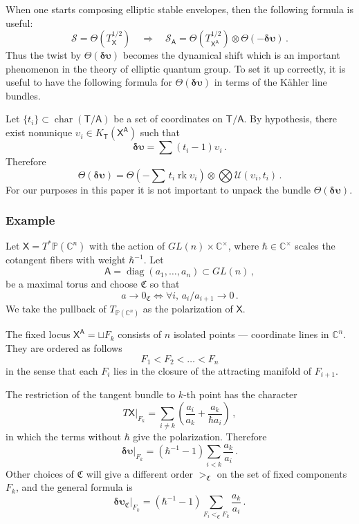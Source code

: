 \documentclass[14pt]{extarticle}
\newcommand{\C}{\mathbb{C}}
\newcommand{\Ct}{\mathbb{C}^\times}
\newcommand{\bT}{\mathsf{T}}
\newcommand{\bA}{\mathsf{A}}
\newcommand{\bX}{\mathsf{X}}
\newcommand{\bP}{\mathbb{P}}
\newcommand{\cU}{\mathscr{U}}
\newcommand{\du}{\boldsymbol{\delta\upsilon}}
\newcommand{\fC}{\mathfrak{C}}
\newcommand{\cS}{\mathscr{S}}
\DeclareMathOperator{\cha}{char}
\DeclareMathOperator{\rk}{rk}
\DeclareMathOperator{\diag}{diag}
\theoremstyle{definition}
\begin{document}
\subsubsection{}

When one starts composing elliptic stable envelopes, then the 
following formula is useful: 
%
\begin{equation}
\cS = \Theta(T^{1/2}_\bX) \quad \Rightarrow
\quad
\cS_\bA = \Theta(T^{1/2}_{\bX^\bA}) \otimes \Theta(-\du)
\,. \label{cSbAdu}
\end{equation}
%
Thus the twist
by $\Theta(\du)$ becomes the dynamical shift which is an important
phenomenon in the theory of elliptic quantum group. To set it up
correctly, it is useful to have the following
formula for $\Theta(\du)$ in terms of the K\"ahler line bundles. 

Let $\{t_i\}\subset \cha(\bT/\bA)$ be a set of coordinates on
$\bT/\bA$. By hypothesis, there exist nonunique $\upsilon_i \in
K_\bT(\bX^\bA)$ such that 
$$
\du = \sum (t_i-1) \upsilon_i \,. 
$$
Therefore
%
\begin{equation}
  \label{Thdyn}
  \Theta(\du) = \Theta(-{\textstyle \sum} \, t_i \rk \upsilon_i) \otimes
\bigotimes \cU(\upsilon_i,  t_i) \,.
\end{equation}
%
For our purposes in this
paper it is not important to unpack the bundle $\Theta(\du)$. 

\subsubsection{Example}\label{ex_2} 
Let $\bX=T^* \bP(\C^n)$ with the action of $GL(n) \times \Ct$, where
$\hbar\in \Ct$  scales the cotangent fibers with weight $\hbar^{-1}$.
Let
$$
\bA = \diag(a_1,\dots,a_n) \subset GL(n)\,, 
$$
be a maximal torus and choose $\fC$ so that
$$
a\to 0_\fC \Leftrightarrow \forall i, \,  a_{i}/a_{i+1} \to 0 \,. 
$$
We take the pullback of $T_{\bP(\C^n)}$ as the polarization of $\bX$.

The fixed locus $\bX^\bA=\sqcup F_k$ consists of $n$ isolated points --- coordinate
lines in $\C^n$. They are ordered as follows
$$
F_1 < F_2 < \dots < F_n
$$
in the sense that each $F_i$ lies in the closure of the attracting
manifold of $F_{i+1}$. 


The restriction of the tangent bundle to $k$-th point
has the character
$$
T\bX\big|_{F_k} = \sum_{i\ne k}  \left ( \frac{a_i}{a_k} +
  \frac{a_k}{\hbar a_i} \right) \,, 
$$
in which the terms without $\hbar$ give the polarization. Therefore
$$
\du \big|_{F_k} = (\hbar^{-1}-1) \sum_{i < k}   \frac{a_k}{a_i} \,. 
$$
Other choices of $\fC$ will give a different order $>_{\fC}$ on the set
of fixed components $F_k$, and the general formula is
$$
\du_\fC \big|_{F_k} = (\hbar^{-1}-1) \sum_{F_i <_{\fC} F_k}   \frac{a_k}{a_i} \,. 
$$
\end{document}
